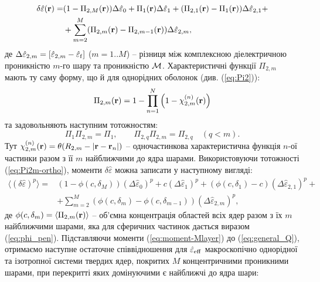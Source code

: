 \documentclass[14pt,twoside]{vakthesis}
\begin{document}
\begin{equation}\label{eq:delta-eps-Mlayers}
\begin{split}
\delta\hat{\varepsilon} ({\bf r}) =& (1 - \Pi_{2,M} ({\bf r})) \Delta\hat{\varepsilon}_0
+ \Pi_1 ({\bf r}) \Delta\hat{\varepsilon}_1
+ (\Pi_{2,1} ({\bf r}) - \Pi_{1} ({\bf r})) \Delta\hat{\varepsilon}_{2,1} +\\
&+ \sum\limits_{m=2}^M (\Pi_{2,m} ({\bf r}) - \Pi_{2,m-1} ({\bf r})) \Delta\hat{\varepsilon}_{2,m},
\end{split}
\end{equation}
де $\Delta\hat{\varepsilon}_{2,m} = [\hat{\varepsilon}_{2,m} - \hat{\varepsilon}_{\rm f}]$ ($m=1..M$) -- різниця між комплексною діелектричною проникністю $m$-го шару та проникністю  $\cal M$. Характеристичні функції $\Pi_{2,m}$ мають ту саму форму, що й для однорідних оболонок (див. (\ref{eq:Pi2})):
\begin{equation}\label{eq:Pi2m}
\Pi_{2,m} ({\bf r}) = 1 - \prod\limits_{n=1}^N \left( 1 - \chi_{2,m}^{(n)} ({\bf r}) \right)
\end{equation}
та задовольняють наступним тотожностям:
\begin{equation}\label{eq:Pi2m-ortho}
	\Pi_1 \Pi_{2,m}  = \Pi_1,\qquad
	\Pi_{2,q} \Pi_{2,m} = \Pi_{2,q} \quad(q<m).
\end{equation}
Тут $\chi_{2,m}^{(n)} ({\bf r}) = \theta(R_{2,m} - |{\bf r} - {\bf r}_n|)$ -- одночастинкова характеристична функція $n$-ої частинки разом з її $m$ найближчими до ядра шарами.
Використовуючи тотожності (\ref{eq:Pi2m-ortho}), моменти $\delta\hat{\varepsilon}$ можна записати у наступному вигляді:
\begin{equation}\label{eq:moment-Mlayer}
\begin{split}
\langle (\delta\hat{\varepsilon})^p \rangle =& 
(1 - \phi(c,\delta_M)) (\Delta\hat{\varepsilon}_0)^p + 
c (\Delta\hat{\varepsilon}_1)^p + (\phi(c,\delta_1) - c) (\Delta\hat{\varepsilon}_{2,1})^p + \\
&+\sum\limits_{m=2}^M (\phi(c,\delta_m) - \phi(c,\delta_{m-1})) (\Delta\hat{\varepsilon}_{2,m})^p,
\end{split}
\end{equation}
де $\phi(c,\delta_m) = \langle \Pi_{2,m} ({\bf r}) \rangle$ -- об'ємна концентрація областей всіх ядер разом з їх $m$ найближчими шарами, яка для сферичних частинок дається виразом (\ref{eq:phi_pen}). 
Підставляючи моменти (\ref{eq:moment-Mlayer}) до (\ref{eq:general_Q}), отримаємо наступне остаточне співвідношення для $\hat{\varepsilon}_{\rm eff}$ макроскопічно однорідної та ізотропної системи твердих ядер, покритих  $M$ концентричними проникними шарами, при перекритті яких домінуючими є найближчі до ядра шари:
\end{document}
